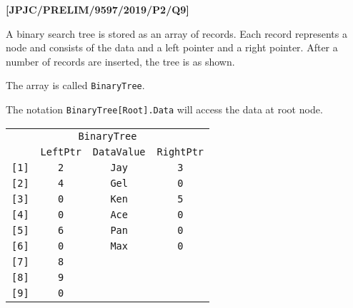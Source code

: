 \item \textbf{{[}JPJC/PRELIM/9597/2019/P2/Q9{]} }

A binary search tree is stored as an array of records. Each record
represents a node and consists of the data and a left pointer and
a right pointer. After a number of records are inserted, the tree
is as shown. 

The array is called \texttt{BinaryTree}. 

The notation \texttt{BinaryTree{[}Root{]}.Data} will access the data
at root node.
\noindent \begin{center}
\begin{tabular}{c|c|c|c|}
\multicolumn{4}{c}{\texttt{BinaryTree}}\tabularnewline
\cline{2-4} \cline{3-4} \cline{4-4} 
 & \texttt{LeftPtr} & \texttt{DataValue} & \texttt{RightPtr}\tabularnewline
\cline{2-4} \cline{3-4} \cline{4-4} 
\texttt{{[}1{]}} & \texttt{2} & \texttt{Jay} & \texttt{3}\tabularnewline
\cline{2-4} \cline{3-4} \cline{4-4} 
\texttt{{[}2{]}} & \texttt{4} & \texttt{Gel} & \texttt{0}\tabularnewline
\cline{2-4} \cline{3-4} \cline{4-4} 
\texttt{{[}3{]}} & \texttt{0} & \texttt{Ken} & \texttt{5}\tabularnewline
\cline{2-4} \cline{3-4} \cline{4-4} 
\texttt{{[}4{]}} & \texttt{0} & \texttt{Ace} & \texttt{0}\tabularnewline
\cline{2-4} \cline{3-4} \cline{4-4} 
\texttt{{[}5{]}} & \texttt{6} & \texttt{Pan} & \texttt{0}\tabularnewline
\cline{2-4} \cline{3-4} \cline{4-4} 
\texttt{{[}6{]}} & \texttt{0} & \texttt{Max} & \texttt{0}\tabularnewline
\cline{2-4} \cline{3-4} \cline{4-4} 
\texttt{{[}7{]}} & \texttt{8} &  & \tabularnewline
\cline{2-4} \cline{3-4} \cline{4-4} 
\texttt{{[}8{]}} & \texttt{9} &  & \tabularnewline
\cline{2-4} \cline{3-4} \cline{4-4} 
\texttt{{[}9{]}} & \texttt{0} &  & \tabularnewline
\cline{2-4} \cline{3-4} \cline{4-4} 
\end{tabular}
\par\end{center}


